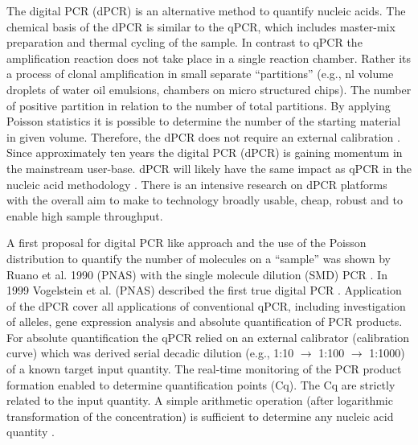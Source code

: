 \documentclass[a4,center,fleqn]{NAR}
\begin{document}
The digital PCR (dPCR) is an alternative method to quantify nucleic acids. The 
chemical basis of the dPCR is similar to the qPCR, which includes master-mix 
preparation and thermal cycling of the sample. In contrast to qPCR the 
amplification reaction does not take place in a single reaction chamber. Rather 
its a process of clonal amplification in small separate ``partitions'' (e.g., nl 
volume droplets of water oil emulsions, chambers on micro structured chips). The 
number of positive partition in relation to the number of total partitions. By 
applying Poisson statistics it is possible to determine the number of the 
starting material in given volume. Therefore, the dPCR does not require an 
external calibration \cite{selck_increased_2013, rodiger_r_2015}. Since 
approximately ten years the digital PCR (dPCR) is gaining momentum in the 
mainstream user-base. dPCR will likely have the same impact as qPCR in the 
nucleic acid methodology \cite{huggett_qpcr_2015, morley_digital_2014, 
rodiger_r_2015}. There is an intensive research on dPCR platforms with the 
overall aim to make to technology broadly usable, cheap, robust and to enable 
high sample throughput.

\enlargethispage{-65.1pt}

A first proposal for digital PCR like approach and the use of the Poisson 
distribution to quantify the number of molecules on a ``sample'' was shown by 
Ruano et al. 1990 (PNAS) with the single molecule dilution (SMD) PCR \cite{ruano_haplotype_1990}. In 1999 
Vogelstein et al. (PNAS) described the first true digital PCR \cite{vogelstein_digital_1999}. Application of 
the dPCR cover all applications of conventional qPCR, including investigation of 
alleles, gene expression analysis and absolute quantification of PCR products. 
For absolute quantification the qPCR relied on an external calibrator 
(calibration curve) which was derived serial decadic dilution (e.g., 1:10 $\rightarrow$ 
1:100 $\rightarrow$ 1:1000) of a known target input quantity. The real-time monitoring of 
the PCR product formation enabled to determine quantification points (Cq). The 
Cq are strictly related to the input quantity. A simple arithmetic operation 
(after logarithmic transformation of the concentration) is sufficient to 
determine any nucleic acid quantity \cite{huggett_considerations_2014}.
\end{document}
